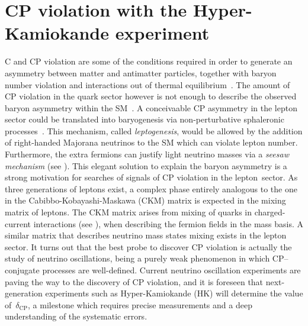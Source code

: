 
\clearpage
\chapter[CP violation with HK]{CP violation with the Hyper-Kamiokande experiment}
\label{cha:cp_hk}


C and CP violation are some of the conditions required in order to generate %
an asymmetry between matter and antimatter particles, together with %
baryon number violation and interactions out of thermal equilibrium~\cite{Sakharov:1967dj}.
The amount of CP violation in the quark sector however is not enough %
to describe the observed baryon asymmetry within the SM~\cite{Farrar:1993hn}.
A conceivaable CP asymmetry in the lepton sector could be translated into baryogenesis %
via non-perturbative sphaleronic processes~\cite{Fukugita:1986hr}.
This mechanism, called \emph{leptogenesis}, would be allowed by the addition of %
right-handed Majorana neutrinos to the SM which can violate lepton number.
Furthermore, the extra fermions can justify light neutrino masses via a \emph{seesaw mechanism} (see ).
This elegant solution to explain the baryon asymmetry is a strong motivation %
for searches of signals of CP violation in the lepton~sector.
As three generations of leptons exist, a complex phase entirely analogous to the one %
in the Cabibbo-Kobayashi-Maskawa (CKM) matrix is expected in the mixing matrix of leptons.
The CKM matrix arises from mixing of quarks in charged-current interactions (see ), %
when describing the fermion fields in the mass basis.
A similar matrix that describes neutrino mass states mixing exists in the lepton sector.
It turns out that the best probe to discover CP violation is actually the study of neutrino oscillations, %
being a purely weak phenomenon in which CP--conjugate processes are well-defined.
Current neutrino oscillation experiments are paving the way to the discovery of CP violation, %
and it is foreseen that next-generation experiments such as Hyper-Kamiokande (HK) %
will determine the value of~$\delta_\text{CP}$, a milestone which requires precise measurements %
and a deep understanding of the systematic errors.

